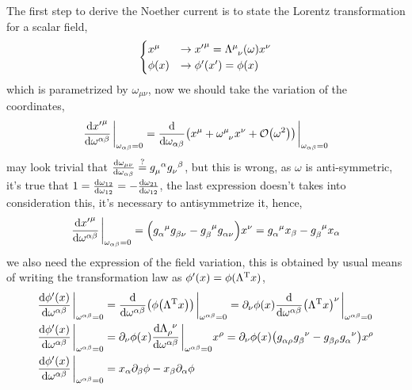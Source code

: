 The first step to derive the Noether current is to state the Lorentz transformation for a scalar field,
\begin{align}
    \begin{cases}
        x^\mu&\rightarrow {x'}^\mu=\tensor{\Lambda}{^\mu_\nu}\qty(\omega)x^\nu\\
        \phi\qty(x)&\rightarrow {\phi'}\qty(x')=\phi\qty(x)
    \end{cases}
\end{align}
which is parametrized by $\omega_{\mu\nu}$, now we should take the variation of the coordinates,
\begin{align}
    \dv{{x'}^\mu}{\omega^{\alpha\beta}}\eval_{\omega_{\alpha\beta}=0}=\dv{}{\omega_{\alpha\beta}}\qty(x^\mu+\tensor{\omega}{^\mu_\nu}x^\nu+\mathcal O\qty(\omega^2))\eval_{\omega_{\alpha\beta}=0}
\end{align}
may look trivial that $\dv{\omega_{\mu\nu}}{\omega_{\alpha\beta}}\stackrel{?}{=}\tensor{g}{_\mu^\alpha}\tensor{g}{_\nu^\beta}$, but this is wrong, as $\omega$ 
is anti-symmetric, it's true that $1=\dv{\omega_{12}}{\omega_{12}}=-\dv{\omega_{21}}{\omega_{12}}$, the last expression doesn't takes into consideration 
this, it's necessary to antisymmetrize it, hence,
\begin{align}
    \dv{{x'}^\mu}{\omega^{\alpha\beta}}\eval_{\omega_{\alpha\beta}=0}=\qty(\tensor{g}{_\alpha^\mu}\tensor{g}{_\beta_\nu}-\tensor{g}{_\beta^\mu}\tensor{g}{_\alpha_\nu})x^\nu=\tensor{g}{_\alpha^\mu}x_\beta-\tensor{g}{_\beta^\mu}x_\alpha\label{eq:xderivativelorentz}
\end{align}
we also need the expression of the field variation, this is obtained by usual means of writing the transformation law as $\phi'(x)=\phi(\Lambda^{\textnormal T}x)$,
\begin{align}
    \dv{\phi'\qty(x)}{\omega^{\alpha\beta}}\eval_{\omega^{\alpha\beta}=0}&=\dv{}{\omega^{\alpha\beta}}\qty(\phi\qty(\Lambda^{\textnormal T}x))\eval_{\omega^{\alpha\beta}=0}=\partial_\nu\phi\qty(x)\dv{}{\omega^{\alpha\beta}}\qty(\Lambda^{\textnormal T}x)^\nu\eval_{\omega^{\alpha\beta}=0}\\
    \dv{\phi'\qty(x)}{\omega^{\alpha\beta}}\eval_{\omega^{\alpha\beta}=0}&=\partial_\nu\phi\qty(x)\dv{\tensor{\Lambda}{_\rho^\nu}}{\omega^{\alpha\beta}}\eval_{\omega^{\alpha\beta}=0}x^\rho=\partial_\nu\phi\qty(x)\qty(\tensor{g}{_\alpha_\rho}\tensor{g}{_\beta^\nu}-\tensor{g}{_\beta_\rho}\tensor{g}{_\alpha^\nu})x^\rho\\
    \dv{\phi'\qty(x)}{\omega^{\alpha\beta}}\eval_{\omega^{\alpha\beta}=0}&=x_\alpha\partial_\beta\phi-x_\beta\partial_\alpha\phi
\end{align}
